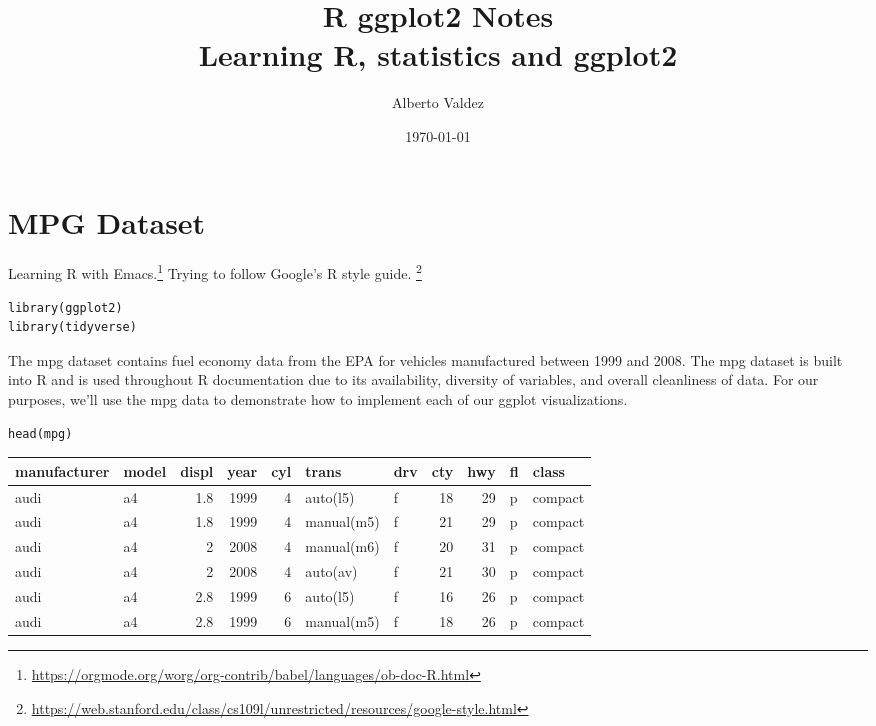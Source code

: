 \documentclass[11pt]{article}
\author{Alberto Valdez}
\date{\today}
\title{R ggplot2 Notes\\\medskip
\large Learning R, statistics and ggplot2}
\begin{document}
\maketitle
\tableofcontents


\section{MPG Dataset}
\label{sec:org8946e3c}

Learning R with Emacs.\footnote{\url{https://orgmode.org/worg/org-contrib/babel/languages/ob-doc-R.html}} Trying to follow Google's R style guide. \footnote{\url{https://web.stanford.edu/class/cs109l/unrestricted/resources/google-style.html}}

\begin{verbatim}
library(ggplot2)
library(tidyverse)
\end{verbatim}

The mpg dataset contains fuel economy data from the EPA for vehicles manufactured between 1999 and 2008. The mpg dataset is built into R and is used throughout R documentation due to its availability, diversity of variables, and overall cleanliness of data. For our purposes, we'll use the mpg data to demonstrate how to implement each of our ggplot visualizations.

\begin{verbatim}
head(mpg)
\end{verbatim}

\begin{org}
\begin{center}
\begin{tabular}{llrrrllrrll}
manufacturer & model & displ & year & cyl & trans & drv & cty & hwy & fl & class\\
\hline
audi & a4 & 1.8 & 1999 & 4 & auto(l5) & f & 18 & 29 & p & compact\\
audi & a4 & 1.8 & 1999 & 4 & manual(m5) & f & 21 & 29 & p & compact\\
audi & a4 & 2 & 2008 & 4 & manual(m6) & f & 20 & 31 & p & compact\\
audi & a4 & 2 & 2008 & 4 & auto(av) & f & 21 & 30 & p & compact\\
audi & a4 & 2.8 & 1999 & 6 & auto(l5) & f & 16 & 26 & p & compact\\
audi & a4 & 2.8 & 1999 & 6 & manual(m5) & f & 18 & 26 & p & compact\\
\end{tabular}
\end{center}
\end{org}
\end{document}
